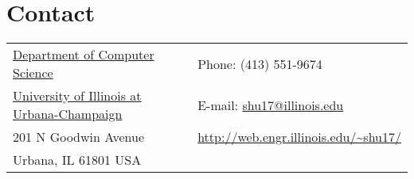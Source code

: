 \section{\sc Contact}
\vspace{.05in}
\begin{tabular}{@{}p{3.66in}p{4in}}
{\href{http://www.cs.illinois.edu/}{Department of Computer Science}}           & {Phone:}  (413) 551-9674 \\
{\href{http://www.illinois.edu/}{University of Illinois at Urbana-Champaign}}  & {E-mail:} {\href{mailto:shu17@illinois.edu}{shu17@illinois.edu}}\\
201 N Goodwin Avenue                                                           & {\url{http://web.engr.illinois.edu/~shu17/}}\\
Urbana, IL 61801 USA\\
\end{tabular}



